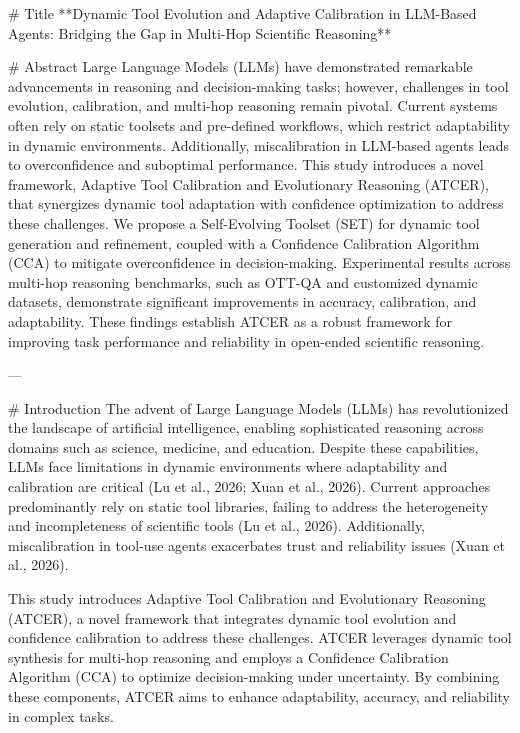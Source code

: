 # Title
**Dynamic Tool Evolution and Adaptive Calibration in LLM-Based Agents: Bridging the Gap in Multi-Hop Scientific Reasoning**

# Abstract
Large Language Models (LLMs) have demonstrated remarkable advancements in reasoning and decision-making tasks; however, challenges in tool evolution, calibration, and multi-hop reasoning remain pivotal. Current systems often rely on static toolsets and pre-defined workflows, which restrict adaptability in dynamic environments. Additionally, miscalibration in LLM-based agents leads to overconfidence and suboptimal performance. This study introduces a novel framework, Adaptive Tool Calibration and Evolutionary Reasoning (ATCER), that synergizes dynamic tool adaptation with confidence optimization to address these challenges. We propose a Self-Evolving Toolset (SET) for dynamic tool generation and refinement, coupled with a Confidence Calibration Algorithm (CCA) to mitigate overconfidence in decision-making. Experimental results across multi-hop reasoning benchmarks, such as OTT-QA and customized dynamic datasets, demonstrate significant improvements in accuracy, calibration, and adaptability. These findings establish ATCER as a robust framework for improving task performance and reliability in open-ended scientific reasoning.

---

# Introduction
The advent of Large Language Models (LLMs) has revolutionized the landscape of artificial intelligence, enabling sophisticated reasoning across domains such as science, medicine, and education. Despite these capabilities, LLMs face limitations in dynamic environments where adaptability and calibration are critical (Lu et al., 2026; Xuan et al., 2026). Current approaches predominantly rely on static tool libraries, failing to address the heterogeneity and incompleteness of scientific tools (Lu et al., 2026). Additionally, miscalibration in tool-use agents exacerbates trust and reliability issues (Xuan et al., 2026).

This study introduces Adaptive Tool Calibration and Evolutionary Reasoning (ATCER), a novel framework that integrates dynamic tool evolution and confidence calibration to address these challenges. ATCER leverages dynamic tool synthesis for multi-hop reasoning and employs a Confidence Calibration Algorithm (CCA) to optimize decision-making under uncertainty. By combining these components, ATCER aims to enhance adaptability, accuracy, and reliability in complex tasks.

